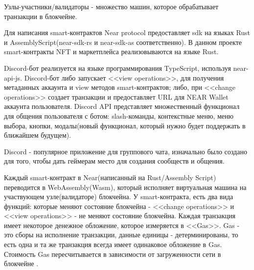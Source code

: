 \begin{definition}
    Узлы-участники/валидаторы - множество машин, которое обрабатывает транзакции в блокчейне.
\end{definition}

Для написания smart-контрактов Near protocol предоставляет sdk на языках Rust и AssemblyScript(near-sdk-rs\cite{nearsdkrs} и near-sdk-as\cite{nearsdkas} соответственно). В данном проекте smart-контракты NFT и маркетплейса реализовываются на языке Rust.

Discord-бот реализуется на языке программирования TypeScript, используя near-api-js\cite{nearapijs}. Discord-бот либо запускает <<view operations>>, для получения метаданных аккаунта и view методов smart-контрактов; либо, при <<change operations>> создает транзакции и предоставляет URL для NEAR Wallet аккаунта пользователя. Discord API представляет множественный функционал для общения пользователя с ботом: slash-команды\cite{discordjsbuttons}, контекстные меню\cite{discordtscontextmenu}, меню выбора\cite{discordjsselectmenus}, кнопки\cite{discordjsbuttons}, модалы\cite{discordjsmodals}(новый функционал, который нужно будет поддержать в ближайшем будущем).

\begin{definition}
    Discord - популярное приложение для группового чата, изначально было создано для того, чтобы дать геймерам место для создания сообществ и общения.
\end{definition}

\begin{remark}
    Каждый smart-контракт в Near(написанный на Rust/Assembly Script) переводится в WebAssembly(Wasm), который исполняет виртуальная машина на участвующем узле(валидаторе) блокчейна. У smart-контракта, есть два вида функций: которые меняют состояние блокчейна - <<change operations>> и <<view operations>> - не меняют состояние блокчейна. Каждая транзакция имеет некоторое денежное обложение, которое измеряется в <<Gas>>. Gas - это сборы на исполнение транзакции, данные единицы - детерминированы, то есть одна и та же транзакция всегда имеет одинаковое обложение в Gas. Стоимость Gas пересчитывается в зависимости от загруженности сети в блокчейне \cite{neargas}.
\end{remark}

